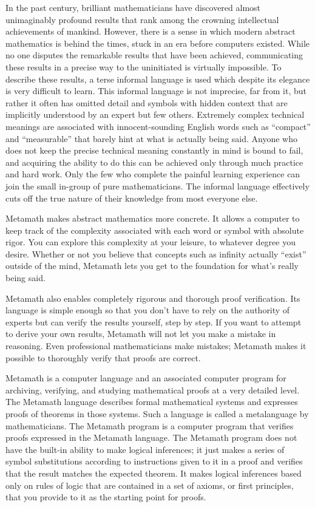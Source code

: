 In the past century, brilliant mathematicians have discovered almost
unimaginably profound results that rank among the crowning intellectual
achievements of mankind.  However, there is a sense in which modern abstract
mathematics is behind the times, stuck in an era before computers existed.
While no one disputes the remarkable results that have been achieved,
communicating these results in a precise way to the uninitiated is virtually
impossible.  To describe these results, a terse informal language is used which
despite its elegance is very difficult to learn.  This informal language is not
imprecise, far from it, but rather it often has omitted detail
and symbols with hidden context that are
implicitly understood by an expert but few others.  Extremely complex technical
meanings are associated with innocent-sounding English words such as
``compact'' and ``measurable'' that barely hint at what is actually being
said.  Anyone who does not keep the precise technical meaning constantly in
mind is bound to fail, and acquiring the ability to do this can be achieved
only through much practice and hard work.  Only the few who complete the
painful learning experience can join the small in-group of pure
mathematicians.  The informal language effectively cuts off the true nature of
their knowledge from most everyone else.

Metamath makes abstract mathematics more concrete.  It allows
a computer to keep track of the complexity associated with each word or symbol
with absolute rigor.  You can explore this complexity at your leisure, to
whatever degree you desire.  Whether or not you believe that concepts such as
infinity actually ``exist'' outside of the mind, Metamath lets you get to the
foundation for what's really being said.

Metamath also enables completely rigorous and thorough proof verification.
Its language is simple enough so that you
don't have to rely on the authority of experts but can verify the results
yourself, step by step.  If you want to attempt to derive your own results,
Metamath will not let you make a mistake in reasoning.
Even professional mathematicians make mistakes; Metamath makes it possible
to thoroughly verify that proofs are correct.

Metamath is a computer language and an associated computer
program for archiving, verifying, and studying mathematical proofs at a very
detailed level.
The Metamath language
describes formal mathematical
systems and expresses proofs of theorems in those systems.  Such a language
is called a metalanguage by mathematicians.
The Metamath program is a computer program that verifies
proofs expressed in the Metamath language.
The Metamath program does not have the built-in
ability to make logical inferences; it just makes a series of symbol
substitutions according to instructions given to it in a proof
and verifies that the result matches the expected theorem.  It makes logical
inferences based only on rules of logic that are contained in a set of
axioms, or first principles, that you provide to it as the
starting point for proofs.

